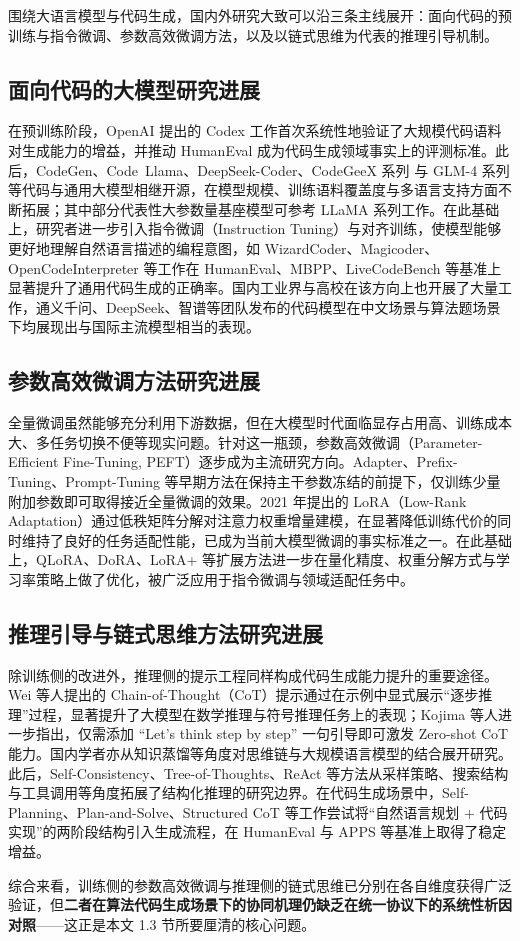 
围绕大语言模型与代码生成，国内外研究大致可以沿三条主线展开：面向代码的预训练与指令微调、参数高效微调方法，以及以链式思维为代表的推理引导机制。

\subsection{面向代码的大模型研究进展}
在预训练阶段，OpenAI 提出的 Codex 工作首次系统性地验证了大规模代码语料对生成能力的增益，并推动 HumanEval 成为代码生成领域事实上的评测标准\cite{chen2021evaluating}。此后，CodeGen\cite{nijkamp2023codegen2}、Code~Llama、DeepSeek-Coder、CodeGeeX 系列\cite{thudm2024codegeex4all9b} 与 GLM-4 系列\cite{team2024chatglm} 等代码与通用大模型相继开源，在模型规模、训练语料覆盖度与多语言支持方面不断拓展；其中部分代表性大参数量基座模型可参考 LLaMA 系列工作\cite{touvron2023llama}。在此基础上，研究者进一步引入指令微调（Instruction Tuning）与对齐训练，使模型能够更好地理解自然语言描述的编程意图\cite{openai2024gpt4}，如 WizardCoder、Magicoder、OpenCodeInterpreter 等工作在 HumanEval、MBPP、LiveCodeBench 等基准上显著提升了通用代码生成的正确率。国内工业界与高校在该方向上也开展了大量工作，通义千问、DeepSeek、智谱等团队发布的代码模型在中文场景与算法题场景下均展现出与国际主流模型相当的表现。

\subsection{参数高效微调方法研究进展}
全量微调虽然能够充分利用下游数据，但在大模型时代面临显存占用高、训练成本大、多任务切换不便等现实问题。针对这一瓶颈，参数高效微调（Parameter-Efficient Fine-Tuning, PEFT）逐步成为主流研究方向。Adapter、Prefix-Tuning、Prompt-Tuning 等早期方法在保持主干参数冻结的前提下，仅训练少量附加参数即可取得接近全量微调的效果。2021 年提出的 LoRA（Low-Rank Adaptation）通过低秩矩阵分解对注意力权重增量建模\cite{hu2021lora}，在显著降低训练代价的同时维持了良好的任务适配性能，已成为当前大模型微调的事实标准之一。在此基础上，QLoRA、DoRA、LoRA+ 等扩展方法进一步在量化精度、权重分解方式与学习率策略上做了优化，被广泛应用于指令微调与领域适配任务中。

\subsection{推理引导与链式思维方法研究进展}
除训练侧的改进外，推理侧的提示工程同样构成代码生成能力提升的重要途径。Wei 等人提出的 Chain-of-Thought（CoT）提示通过在示例中显式展示“逐步推理”过程，显著提升了大模型在数学推理与符号推理任务上的表现\cite{wei2022chain}；Kojima 等人进一步指出，仅需添加 “Let's think step by step” 一句引导即可激发 Zero-shot CoT 能力\cite{kojima2022large}。国内学者亦从知识蒸馏等角度对思维链与大规模语言模型的结合展开研究\cite{li2024cotkd}。此后，Self-Consistency、Tree-of-Thoughts、ReAct 等方法从采样策略、搜索结构与工具调用等角度拓展了结构化推理的研究边界。在代码生成场景中，Self-Planning、Plan-and-Solve、Structured CoT 等工作尝试将“自然语言规划 + 代码实现”的两阶段结构引入生成流程，在 HumanEval 与 APPS 等基准上取得了稳定增益\cite{chen2021evaluating,hendrycks2021measuring}。

综合来看，训练侧的参数高效微调与推理侧的链式思维已分别在各自维度获得广泛验证，但\textbf{二者在算法代码生成场景下的协同机理仍缺乏在统一协议下的系统性析因对照}——这正是本文 1.3 节所要厘清的核心问题。